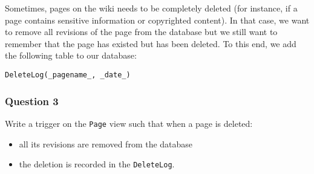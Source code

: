 \documentclass{beamer}
\begin{document}
\begin{frame}[fragile]
Sometimes, pages on the wiki needs to be completely deleted (for
instance, if a page contains sensitive information or copyrighted
content). In that case, we want to remove all revisions of the page from
the database but we still want to remember that the page has existed but
has been deleted. To this end, we add the following table to our
database:

\begin{verbatim}
DeleteLog(_pagename_, _date_)
\end{verbatim}
\end{frame}

\begin{frame}
  \frametitle{Question 3}
  Write a trigger on the \texttt{Page} view such that when a page is deleted:
  \begin{itemize}
    \item all its revisions are removed from the database
    \item the deletion is recorded in the \texttt{DeleteLog}.
  \end{itemize}
\end{frame}
\end{document}
